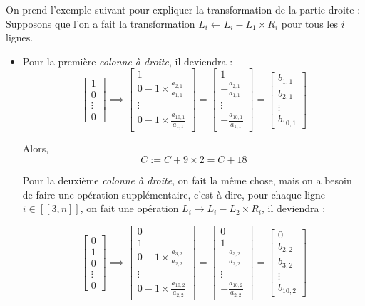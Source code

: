\documentclass{article}
\begin{document}
On prend l'exemple suivant pour expliquer la transformation de la partie droite : Supposons que l'on a fait la transformation $L_i \leftarrow L_i - L_1 \times R_i$ pour tous les $i$ lignes.
\begin{itemize}
    \item Pour la première \textit{colonne à droite},  il deviendra :
\[
\begin{bmatrix} 1 \\ 0 \\ \vdots \\ 0 \end{bmatrix} \implies
\begin{bmatrix}
 1\\
 0-1\times\frac{a_{2,1}}{a_{1,1}} \\
 \vdots\\
 0-1\times\frac{a_{10,1}}{a_{1,1}}
\end{bmatrix}=
\begin{bmatrix}
 1\\
 -\frac{a_{2,1}}{a_{1,1}} \\
 \vdots\\
-\frac{a_{10,1}}{a_{1,1}}
\end{bmatrix}=
\begin{bmatrix}
b_{1,1}\\
b_{2,1}\\
\vdots\\
b_{10,1}
\end{bmatrix}
\]

Alors, \[
C := C + 9 \times 2 = C + 18
\]

Pour la deuxième \textit{colonne à droite}, on fait la même chose, mais on a besoin de faire une opération supplémentaire, c'est-à-dire, pour chaque ligne $i \in [\![3, n]\!]$, on fait une opération $L_i \rightarrow L_i - L_2 \times R_i$, il deviendra :

\[
\begin{bmatrix} 0 \\ 1 \\ 0 \\ \vdots \\ 0 \end{bmatrix}  \implies
\begin{bmatrix}
 0\\
 1\\
 0-1\times\frac{a_{3,2}}{a_{2,2}} \\
 \vdots\\
 0-1\times\frac{a_{10,2}}{a_{2,2}}
\end{bmatrix}=
\begin{bmatrix}
 0\\
 1\\
 -\frac{a_{3,2}}{a_{2,2}} \\
 \vdots\\
-\frac{a_{10,2}}{a_{2,2}}
\end{bmatrix}=
\begin{bmatrix}
0 \\
b_{2,2}\\
b_{3,2}\\
\vdots\\
b_{10,2}
\end{bmatrix}
\]


\end{itemize}
\end{document}
